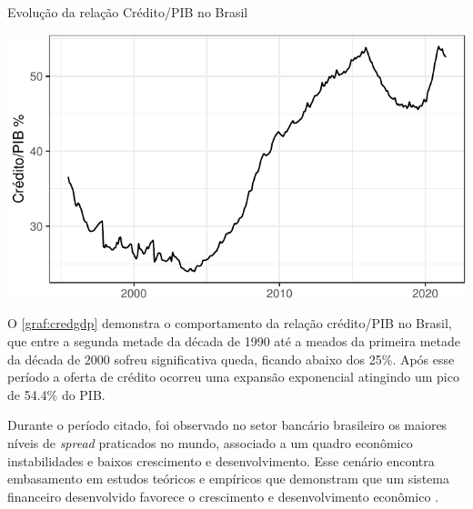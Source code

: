 \documentclass[
  12pt,
  12pt,
  openright,
  oneside,
  a4paper,
  chapter=TITLE,
  section=TITLE,
  subsection=TITLE,
  subsubsection=TITLE,
  english,
  portugues,
  sumario=tradicional]{abntex2}
\begin{document}
\begin{grafico}[!htb]
\vspace{20pt}
\caption{Evolução da relação Crédito/PIB no Brasil}
\vspace{-4mm}

\begin{center}\includegraphics{12-exportedfigures/credit.gdp-1} \end{center}
\vspace{-3mm}
\label{graf:credgdp}
\vspace{-2mm}
\end{grafico}

O \autoref{graf:credgdp} demonstra o comportamento da relação crédito/PIB no Brasil, que entre a segunda metade da década de 1990 até a meados da primeira metade da década de 2000 sofreu significativa queda, ficando abaixo dos 25\%. Após esse período a oferta de crédito ocorreu uma expansão exponencial atingindo um pico de 54.4\% do PIB.

Durante o período citado, foi observado no setor bancário brasileiro os maiores níveis de \emph{spread} praticados no mundo, associado a um quadro econômico instabilidades e baixos crescimento e desenvolvimento. Esse cenário encontra embasamento em estudos teóricos e empíricos que demonstram que um sistema financeiro desenvolvido favorece o crescimento e desenvolvimento econômico \cite{levine:1997, matos:2003}.
\end{document}
